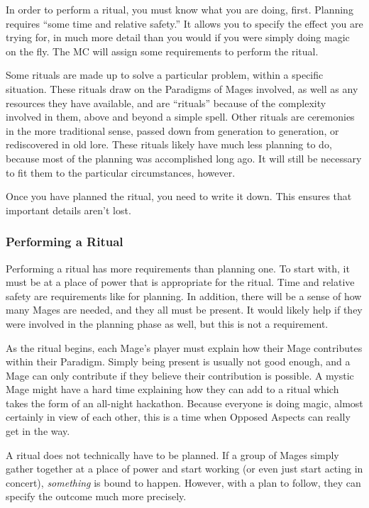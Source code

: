 \documentclass[
]{article}
\begin{document}
In order to perform a ritual, you must know what you are doing, first.
Planning requires ``some time and relative safety.'' It allows you to
specify the effect you are trying for, in much more detail than you
would if you were simply doing magic on the fly. The MC will assign some
requirements to perform the ritual.

Some rituals are made up to solve a particular problem, within a
specific situation. These rituals draw on the Paradigms of Mages
involved, as well as any resources they have available, and are
``rituals'' because of the complexity involved in them, above and beyond
a simple spell. Other rituals are ceremonies in the more traditional
sense, passed down from generation to generation, or rediscovered in old
lore. These rituals likely have much less planning to do, because most
of the planning was accomplished long ago. It will still be necessary to
fit them to the particular circumstances, however.

Once you have planned the ritual, you need to write it down. This
ensures that important details aren't lost.

\hypertarget{performing-a-ritual}{%
\subsubsection{Performing a Ritual}\label{performing-a-ritual}}

Performing a ritual has more requirements than planning one. To start
with, it must be at a place of power that is appropriate for the ritual.
Time and relative safety are requirements like for planning. In
addition, there will be a sense of how many Mages are needed, and they
all must be present. It would likely help if they were involved in the
planning phase as well, but this is not a requirement.

As the ritual begins, each Mage's player must explain how their Mage
contributes within their Paradigm. Simply being present is usually not
good enough, and a Mage can only contribute if they believe their
contribution is possible. A mystic Mage might have a hard time
explaining how they can add to a ritual which takes the form of an
all-night hackathon. Because everyone is doing magic, almost certainly
in view of each other, this is a time when Opposed Aspects can really
get in the way.

A ritual does not technically have to be planned. If a group of Mages
simply gather together at a place of power and start working (or even
just start acting in concert), \emph{something} is bound to happen.
However, with a plan to follow, they can specify the outcome much more
precisely.
\end{document}
